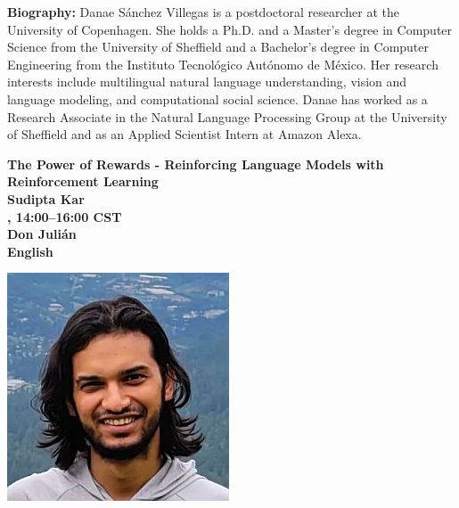 {\bfseries Biography:}
Danae Sánchez Villegas is a postdoctoral researcher at the University of Copenhagen. She holds a Ph.D. and a Master's degree in Computer Science from the University of Sheffield and a Bachelor's degree in Computer Engineering from the Instituto Tecnológico Autónomo de México. Her research interests include multilingual natural language understanding, vision and language modeling, and computational social science. Danae has worked as a Research Associate in the Natural Language Processing Group at the University of Sheffield and as an Applied Scientist Intern at Amazon Alexa.
\clearpage

\begin{center}
{\bfseries\Large The Power of Rewards - Reinforcing Language Models with Reinforcement Learning} \\
\vspace{1.0em}
{\large\bf Sudipta Kar} \\

\textbf{\daydateyear{}, 14:00--16:00 CST}\\
\textbf{Don Juli\'an}\\
\textbf{English}
\end{center}

\begin{center}
    \includegraphics[width=0.4\linewidth]{content/mexican_nlp/sudipta.jpeg}
\end{center}

